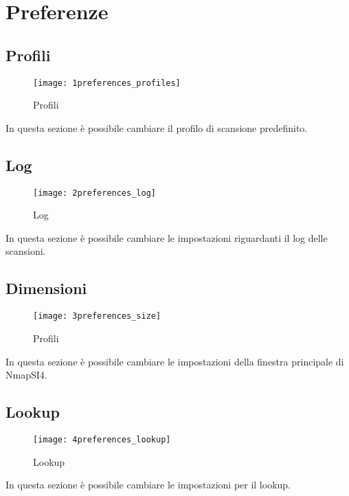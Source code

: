 \chapter{Preferenze}
\label{ch:Preferences}

\section{Profili}
\label{sec:profiles}

\begin{figure}[h]
  \centering
  \texttt{[image: 1preferences\_profiles]}
  \caption{Profili}
  \label{fig:Profili}
\end{figure}
In questa sezione \`e possibile cambiare il profilo di scansione predefinito.

\section{Log}
\label{sec:Log}

\begin{figure}[h]
  \centering
  \texttt{[image: 2preferences\_log]}
  \caption{Log}
  \label{fig:Log}
\end{figure}
In questa sezione \`e possibile cambiare le impostazioni riguardanti il log 
delle scansioni.

\section{Dimensioni}
\label{sec:Dimensions}

\begin{figure}[h]
  \centering
  \texttt{[image: 3preferences\_size]}
  \caption{Profili}
  \label{fig:Profili}
\end{figure}
In questa sezione \`e possibile cambiare le impostazioni della finestra 
principale di NmapSI4.

\section{Lookup}
\label{sec_PreferencesLookup}

\begin{figure}[h]
  \centering
  \texttt{[image: 4preferences\_lookup]}
  \caption{Lookup}
  \label{fig:PreferencesLookup}
\end{figure}
In questa sezione \`e possibile cambiare le impostazioni per il lookup.

